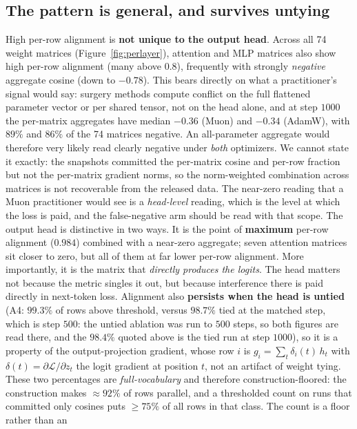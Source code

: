 \subsection{The pattern is general, and survives untying}
\label{sec:general}
High per-row alignment is \textbf{not unique to the output head}. Across all 74
weight matrices (Figure~\ref{fig:perlayer}), attention and MLP matrices also show
high per-row alignment (many above 0.8), frequently with strongly \emph{negative}
aggregate cosine (down to $-0.78$). This bears directly on what a practitioner's
signal would say: surgery methods compute conflict on the full flattened parameter
vector or per shared tensor, not on the head alone, and at step $1000$ the per-matrix
aggregates have median $-0.36$ (Muon) and $-0.34$ (AdamW), with $89\%$ and $86\%$ of
the 74 matrices negative. An all-parameter aggregate would therefore very likely read
clearly negative under \emph{both} optimizers. We cannot state it exactly: the
snapshots committed the per-matrix cosine and per-row fraction but not the per-matrix
gradient norms, so the norm-weighted combination across matrices is not recoverable
from the released data. The near-zero reading that a Muon practitioner would see is a
\emph{head-level} reading, which is the level at which the loss is paid, and the
false-negative arm should be read with that scope. The output head is distinctive in two ways. It is the point of \textbf{maximum} per-row alignment ($0.984$) combined with a near-zero aggregate; seven attention matrices sit closer to zero, but all of them at far lower per-row alignment. More importantly, it is the matrix that \emph{directly produces the logits}. The head matters not because the metric singles it out, but
because interference there is paid directly in next-token loss. Alignment also
\textbf{persists when the head is untied} (A4: $99.3\%$ of rows above threshold,
versus $98.7\%$ tied at the matched step, which is step $500$: the untied ablation
was run to $500$ steps, so both figures are read there, and the $98.4\%$ quoted
above is the tied run at step $1000$), so it is a property of the
output-projection gradient, whose row $i$ is $g_i = \sum_t \delta_i(t)\, h_t$ with
$\delta(t) = \partial\mathcal{L}/\partial z_t$ the logit gradient at position $t$,
not an artifact of weight tying. These two percentages are \emph{full-vocabulary}
and therefore construction-floored: the construction makes ${\approx}92\%$ of rows
parallel, and a thresholded count on runs that committed only cosines puts
${\geq}75\%$ of all rows in that class. The count is a floor rather than an
